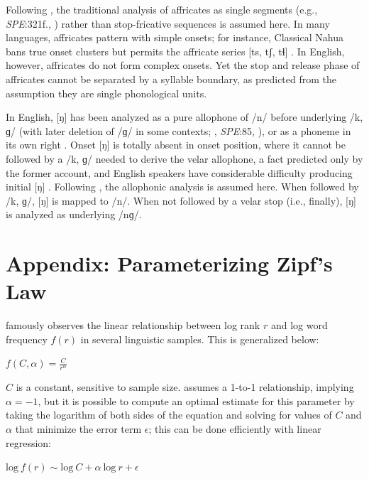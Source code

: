 \documentclass[12pt]{article}
\begin{document}
Following \citet{Pierrehumbert1994}, the traditional analysis of affricates as single segments (e.g., \emph{SPE}:321f., \citealp[24]{Jakobson1961}) rather than stop-fricative sequences \citep[e.g.,][]{Hualde1988,Lombardi1990} is assumed here. In many languages, affricates pattern with simple onsets; for instance, Classical Nahua bans true onset clusters but permits the affricate series [ts, tʃ, tɬ] \citep[9]{Launey2011}. In English, however, affricates do not form complex onsets. Yet the stop and release phase of affricates cannot be separated by a syllable boundary, as predicted from the assumption they are single phonological units.

In English, [ŋ] has been analyzed as a pure allophone of /n/ before underlying /k, ɡ/ (with later deletion of /ɡ/ in some contexts; \citealt[65f.]{Borowsky1986}, \emph{SPE}:85, \citealt[62]{Halle1985a}), or as a phoneme in its own right \citep[e.g.,][]{Jusczyk2002,Sapir1925}. Onset [ŋ] is totally absent in onset position, where it cannot be followed by a /k, ɡ/ needed to derive the velar allophone, a fact predicted only by the former account, and English speakers have considerable difficulty producing initial [ŋ] \citep{Rusaw2009}. Following \citet{Pierrehumbert1994}, the allophonic analysis is assumed here. When followed by /k, ɡ/, [ŋ] is mapped to /n/. When not followed by a velar stop (i.e., finally), [ŋ] is analyzed as underlying /nɡ/.

\section{Appendix: Parameterizing Zipf's Law}
\label{zr}

\citet{Zipf1949} famously observes the linear relationship between log rank $r$ and log word frequency $f(r)$ in several linguistic samples. This is generalized below:

\begin{unlabeledexample} 
$\displaystyle f(C, \alpha) = \frac{C}{r^\alpha}$ 
\end{unlabeledexample} 

\noindent 
$C$ is a constant, sensitive to sample size. \citeauthor{Zipf1949} assumes a 1-to-1 relationship, implying $\alpha = -1$, but it is possible to compute an optimal estimate for this parameter by taking the logarithm of both sides of the equation and solving for values of $C$ and $\alpha$ that minimize the error term $\epsilon$; this can be done efficiently with linear regression:

\begin{unlabeledexample} 
$\displaystyle \textrm{log}~f(r) \sim \textrm{log}~C + \alpha~\textrm{log}~r + \epsilon$  
\end{unlabeledexample}
\end{document}
